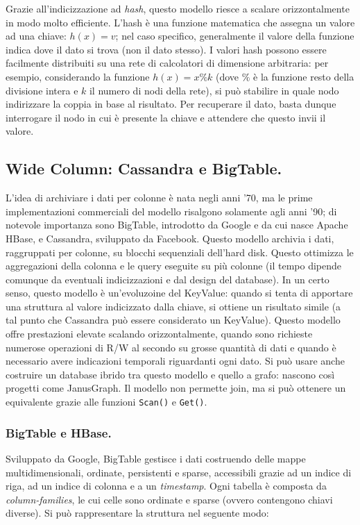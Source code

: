 \documentclass[a4page, 11pt]{article}
\begin{document}
Grazie all'indicizzazione ad \textit{hash}, questo modello riesce a scalare orizzontalmente in modo molto efficiente.
L'hash è una funzione matematica che assegna un valore ad una chiave: $h(x) = v$; nel caso specifico, generalmente il valore della funzione indica dove il dato si trova (non il dato stesso).
I valori hash possono essere facilmente distribuiti su una rete di calcolatori di dimensione arbitraria: per esempio, considerando la funzione $h(x) = x \% k$ (dove $\%$ è la funzione resto della divisione intera e $k$ il numero di nodi della rete), si può stabilire in quale nodo indirizzare la coppia in base al risultato.
Per recuperare il dato, basta dunque interrogare il nodo in cui è presente la chiave e attendere che questo invii il valore.


\subsection{Wide Column: Cassandra\cite{Cassandra} e BigTable.}
L'idea di archiviare i dati per colonne è nata negli anni '70, ma le prime implementazioni commerciali del modello risalgono solamente agli anni '90; di notevole importanza sono BigTable, introdotto da Google e da cui nasce Apache HBase, e Cassandra, sviluppato da Facebook.
Questo modello archivia i dati, raggruppati per colonne, su blocchi sequenziali dell'hard disk.
Questo ottimizza le aggregazioni della colonna e le query eseguite su più colonne (il tempo dipende comunque da eventuali indicizzazioni e dal design del database).
In un certo senso, questo modello è un'evoluzoine del KeyValue: quando si tenta di apportare una struttura al valore indicizzato dalla chiave, si ottiene un risultato simile (a tal punto che Cassandra può essere considerato un KeyValue).
Questo modello offre prestazioni elevate scalando orizzontalmente, quando sono richieste numerose operazioni di R/W al secondo su grosse quantità di dati e quando è necessario avere indicazioni temporali riguardanti ogni dato.
Si può usare anche costruire un database ibrido tra questo modello e quello a grafo: nascono così progetti come JanusGraph.
Il modello non permette join, ma si può ottenere un equivalente grazie alle funzioni \verb|Scan()| e \verb|Get()|.

\subsubsection*{BigTable e HBase.}
Sviluppato da Google, BigTable gestisce i dati costruendo delle mappe multidimensionali, ordinate, persistenti e sparse, accessibili grazie ad un indice di riga, ad un indice di colonna e a un \textit{timestamp}.
Ogni tabella è composta da \textit{column-families}, le cui celle sono ordinate e sparse (ovvero contengono chiavi diverse).
Si può rappresentare la struttura nel seguente modo:
\end{document}
